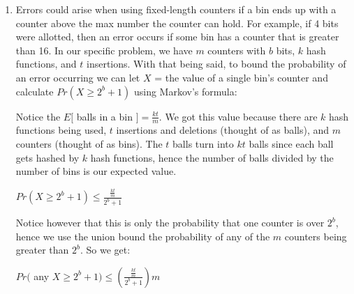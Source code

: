 \documentclass[11pt]{amsart}
\begin{document}
\begin{enumerate}
{$\newline$

c.) Originally we thought there were $n!$ different Hamiltonian cycles in a complete graph, but then we realized we over counted because the starting point is arbitrary so we got $(n-1)!$.  At this point we thought we were close but had a feeling we were over counting still, we then considered the inverse of a cycle and noticed we were double counting every cycle so we decided that there are $\frac{1}{2}(n-1)!$ distinct Hamiltonian cycles in a complete graph. $p^n$ represents the $n$ necessary edges in the Hamiltonian cycle, hence we get:

 $\Rightarrow \frac{1}{2}(n-1)! p^n = 1$ 

$\Rightarrow (n-1)!p^n = 2$

$\Rightarrow p^n = \frac{2}{(n-1)!}$

$\Rightarrow p = (\frac{2}{(n-1)!})^{\frac{1}{n}}$


}

\item {}

{

Errors could arise when using fixed-length counters if a bin ends up with a counter above the max number the counter can hold. For example, if 4 bits were  allotted, then an error occurs if some bin has a counter that is greater than 16. In our specific problem, we have $m$ counters with $b$ bits, $k$ hash functions, and $t$ insertions. With that being said, to bound the probability of an error occurring we can let $X$ = the value of a single bin's counter and calculate $Pr(X \geq 2^b + 1)$ using Markov's formula:

Notice the $E[$  balls in a bin $] = \frac{kt}{m}$. We got this value because there are $k$ hash functions being used, $t$ insertions and deletions (thought of as balls), and $m$ counters (thought of as bins). The $t$ balls turn into $kt$ balls since each ball gets hashed by $k$ hash functions, hence the number of balls divided by the number of bins is our expected value.


 $Pr(X \geq 2^b + 1) \leq \frac{\frac{kt}{m}}{2^b+1}$
 
 Notice however that this is only the probability that one counter is over $2^b$, hence we use the union bound the probability of any of the $m$ counters being greater than $2^b$. So we get:
 
  $Pr($ any $X \geq 2^b + 1) \leq (\frac{\frac{kt}{m}}{2^b+1})m$
  
}
\end{enumerate}
\end{document}
